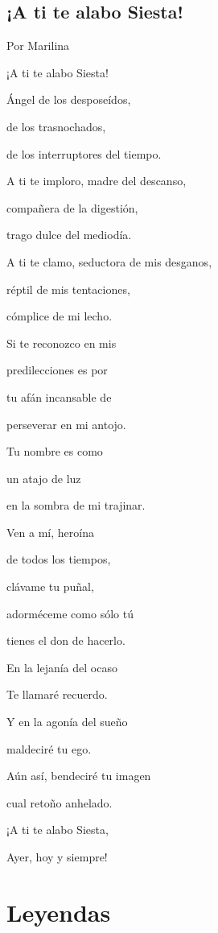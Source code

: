 \documentclass[11pt,twoside,openright,a5paper]{book}
\begin{document}
\section*{¡A ti te alabo Siesta!}
                                                                                                  \begin{flushright}Por Marilina\end{flushright}
\begin{center}
¡A ti te alabo Siesta!

Ángel de los desposeídos,

de los trasnochados, 

de los interruptores del tiempo.

A ti te imploro, madre del descanso, 

compañera de la digestión,

trago dulce del mediodía. 

A ti te clamo, seductora de mis desganos, 

réptil de mis tentaciones, 

cómplice de mi lecho.

Si te reconozco en mis 

predilecciones es por 

tu afán incansable de 

perseverar en mi antojo.

Tu nombre es como

un atajo de luz

en la sombra de mi trajinar.

Ven a mí, heroína

de todos los tiempos, 

clávame tu puñal, 

adorméceme como sólo tú

tienes el don de hacerlo.

En la lejanía del ocaso

Te llamaré recuerdo.

Y en la agonía del sueño

maldeciré  tu ego.

Aún así, bendeciré tu imagen

cual retoño anhelado.

¡A ti te alabo Siesta,

Ayer, hoy y siempre!
\end{center}

\chapter*{Leyendas}
\end{document}
